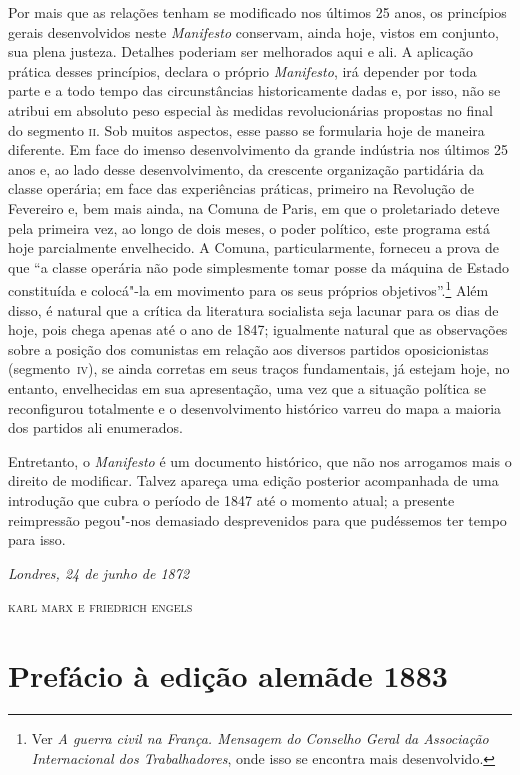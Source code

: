 Por mais que as relações tenham se modificado nos últimos 25
anos, os princípios gerais desenvolvidos neste \textit{Manifesto}
conservam, ainda hoje, vistos em conjunto, sua plena justeza. Detalhes
poderiam ser melhorados aqui e ali. A aplicação prática desses
princípios, declara o próprio \textit{Manifesto}, irá depender por toda
parte e a todo tempo das circunstâncias historicamente dadas e, por
isso, não se atribui em absoluto peso especial às medidas
revolucionárias propostas no final do segmento \textsc{ii}. Sob muitos aspectos,
esse passo se formularia hoje de maneira diferente. Em face do imenso
desenvolvimento da grande indústria nos últimos 25 anos e,
ao lado desse desenvolvimento, da crescente organização partidária da
classe operária; em face das experiências práticas, primeiro na
Revolução de Fevereiro e, bem mais ainda, na Comuna de Paris, em que o
proletariado deteve pela primeira vez, ao longo de dois meses, o poder
político, este programa está hoje parcialmente envelhecido. A Comuna,
particularmente, forneceu a prova de que “a classe operária não pode
simplesmente tomar posse da máquina de Estado constituída e colocá"-la
em movimento para os seus próprios objetivos”.\footnote{Ver \textit{A guerra
civil na França. Mensagem do Conselho Geral da Associação Internacional
dos Trabalhadores}, onde isso se encontra mais
desenvolvido.} Além disso, é natural que a crítica da literatura
socialista seja lacunar para os dias de hoje, pois chega apenas até o
ano de 1847; igualmente natural que as observações sobre a posição dos
comunistas em relação aos diversos partidos oposicionistas (\mbox{segmento \textsc{iv}}),
se ainda corretas em seus traços fundamentais, já estejam hoje, no entanto, envelhecidas em sua apresentação, uma vez que a situação
política se reconfigurou totalmente e o desenvolvimento histórico
varreu do mapa a maioria dos partidos ali enumerados.

Entretanto, o \textit{Manifesto} é um documento histórico, que não nos
arrogamos mais o direito de modificar. Talvez apareça uma edição
posterior acompanhada de uma introdução que cubra o período de 1847 até
o momento atual; a presente reimpressão pegou"-nos demasiado
desprevenidos para que pudéssemos ter tempo para isso.
\bigskip

\hfill \textit{Londres, 24 de junho de 1872}

\hfill \textsc{karl marx e friedrich engels}

\chapter[Prefácio à edição alemã de 1883]{Prefácio à edição alemã\break de 1883}

